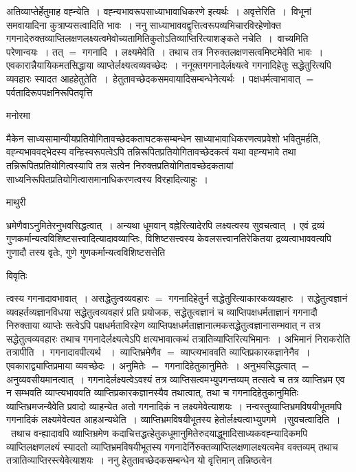 \documentclass[10pt, openany]{book}
\begin{document}
{अतिव्याप्तेर्हेतुमाह वह्न्येति~। वह्न्यभावरूपसाध्याभावाधिकरणे इत्यर्थः~। {\qt अवृत्तेरिति~}।~विभूनां समवायादिना कुत्राप्यसत्वादिति भावः~। ननु साध्याभाववद्वृत्तित्वरूपव्यभिचारविरहेणोक्त गगनादेरुक्तव्याप्तिलक्षणलक्ष्यत्वमेवोच्यतामितिकुतोऽतिव्याप्तिरित्याशङ्कते {\qt नचेति~}।~वाच्यमिति परेणान्वयः~। तत् $=$ गगनादि~। {\qt लक्ष्यमेवेति~}। तथाच तत्र निरुक्तलक्षणसत्वमिष्टमेवेति भावः~। एवकारान्नैयायिकमतसिद्धाया व्याप्तेर्लक्ष्यत्वव्यवच्छेदः~। ननूक्तगगनादेर्लक्ष्यत्वे गगनादिहेतुः सद्धेतुरित्यपि व्यवहारः स्यादत आह\textendash  हेतुतेति~।~हेतुतावच्छेदकसमवायादिसम्बन्धेनेत्यर्थः~। पक्षधर्मत्वाभावात् $=$ पर्वतादिरूपपक्षनिरूपितवृत्ति
\begin{center}   मनोरमा  \end{center}
मैकेन साध्यसामान्यीयप्रतियोगितावच्छेदकताघटकसम्बन्धेन साध्याभावाधिकरणत्वप्रवेशो भवितुमर्हति, वह्न्यभाववद्भेदस्य वन्हिस्वरूपत्वेऽपि तन्निरूपितप्रतियोगितावच्छेदकत्वं यथा वह्न्यभावे तथा तन्निरूपितप्रतियोगित्वस्यापि तत्र सत्वेन निरुक्तप्रतियोगितावच्छेदकतायां साध्यनिरूपितप्रतियोगित्वासमानाधिकरणत्वस्य विरहादित्याहुः~।
\newpage
\begin{center}  माथुरी  \end{center}
{\la भ्रमेणैवाऽनुमितेरनुभवसिद्धत्वात्~। अन्यथा धूमवान् वह्नेरित्यादेरपि 
लक्ष्यत्वस्य सुवचत्वात्~। एवं द्रव्यं गुणकर्मान्यत्वविशिष्टसत्त्वादित्यादावव्याप्तिः, विशिष्टसत्त्वस्य केवलसत्त्वानतिरेकितया द्रव्यत्वाभाववत्यपि गुणादौ तस्य वृतेः, गुणे गुणकर्मान्यत्वविशिष्टसत्तेति}
\begin{center}     विवृतिः \end{center}
त्वस्य गगनादावभावात्~। असद्धेतुत्वव्यवहारः $=$ गगनादिहेतुर्न सद्धेतुरित्याकारकव्यवहारः~। सद्धेतुत्वज्ञानं व्यवहर्तव्यज्ञानविधया सद्धेतुत्वव्यवहारं प्रति प्रयोजक, सद्धेतुत्वज्ञानं च व्याप्तिपक्षधर्मताज्ञानं गगनादौ निरुक्ताया व्याप्तेः सत्वेऽपि पक्षधर्मताविरहेण व्याप्तिपक्षधर्मताज्ञानात्मकसद्धेतुत्वज्ञानासम्भवात् न तत्र सद्धेतुत्वव्यवहारः तथाच गगनादेर्लक्ष्यत्वेऽपि क्षत्यभावात्कथं तत्रातिव्याप्तिरित्यभिमानः~। अभिमानं निराकरोति {\la तत्रापीति~।}~गगनादावपीत्यर्थ ~।~व्याप्तिभ्रमेणैव $=$ व्याप्त्यभाववति व्याप्तिप्रकारकज्ञानेनैव~। एवकाराद्व्याप्तिप्रमाया व्यवच्छेदः~। अनुमितेः $=$ गगनादिहेतुकानुमितेः~। अनुभवसिद्धत्वात् $=$ अनुव्यवसीयमानत्वात्~। गगनादेर्लक्ष्यत्वेऽवश्यं तत्र
व्याप्तिसत्वमभ्युपगन्तव्यम् तत्सत्वे च तत्र व्याप्तिभ्रम एव न सम्भवति व्याप्त्यभाववति व्याप्तिप्रकारकज्ञानस्यैव तथात्वात्, तथा च गगनादिहेतुकानुमितिः व्याप्तिभ्रमजन्यैवेति प्रवादो व्याहन्येत अतो गगनादिकं न लक्ष्यमेवेत्याशयः~। नन्वस्तुव्याप्तिभ्रमविषयीभूतमपि गगनादिकं लक्ष्यमेवेत्यत आह\textendash  अन्यथेति~। व्याप्तिभ्रमविषयीभूतस्य हेतोर्लक्ष्यत्वाभ्युपगमे~।{\qt सुवचत्वादिति~}।~तथाच वन्ह्यादावपि व्याप्तिभ्रमेण कदाचित्तद्धत्हेतुकधूमानुमितेरुदयाद्धूमादिसाध्यकवह्न्यादिकमपि व्याप्तिलक्षणलक्ष्यं स्यादतो व्याप्तिभ्रमविषयीभूतस्य गगनादेर्निरुक्तव्याप्तिलक्षणालक्ष्यत्वमेव वक्तव्यम् तथाच तत्रातिव्याप्तिरस्त्येवेत्याशयः~। ननु हेतुतावच्छेदकसम्बन्धेन यो वृत्तिमान् तन्निष्ठत्वेन
}
\end{document}
